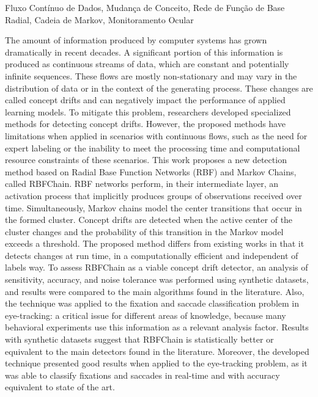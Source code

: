 \documentclass[msc, classic, a4paper]{ufbathesis}
\begin{document}
\begin{keywords}
    Fluxo Contínuo de Dados, Mudança de Conceito, Rede de Função de Base Radial, Cadeia de Markov, Monitoramento Ocular
\end{keywords}

\abstract
The amount of information produced by computer systems has grown dramatically in recent decades.
A significant portion of this information is produced as continuous streams of data, which are constant and potentially infinite sequences.
These flows are mostly non-stationary and may vary in the distribution of data or in the context of the generating process.
These changes are called concept drifts and can negatively impact the performance of applied learning models.
To mitigate this problem, researchers developed specialized methods for detecting concept drifts.
However, the proposed methods have limitations when applied in scenarios with continuous flows,
such as the need for expert labeling or the inability to meet the processing time and computational resource constraints of these scenarios.
This work proposes a new detection method based on Radial Base Function Networks (RBF) and Markov Chains, called RBFChain.
RBF networks perform, in their intermediate layer, an activation process that implicitly produces groups of observations received over time.
Simultaneously, Markov chains model the center transitions that occur in the formed cluster.
Concept drifts are detected when the active center of the cluster changes and the probability of this transition in the Markov model exceeds a threshold.
The proposed method differs from existing works in that it detects changes at run time,  in a computationally efficient and independent of labels way.
%
To assess RBFChain as a viable concept drift detector, an analysis of sensitivity, accuracy, and noise tolerance was performed using synthetic datasets, and results were compared to the main algorithms found in the literature.
%
Also, the technique was applied to the fixation and saccade classification problem in eye-tracking: a critical issue for different areas of knowledge, because many behavioral experiments use this information as a relevant analysis factor.
%
Results with synthetic datasets suggest that RBFChain is statistically better or equivalent to the main detectors found in the literature.
Moreover, the developed technique presented good results when applied to the eye-tracking problem, as it was able to classify fixations and saccades in real-time and with accuracy equivalent to state of the art.
\end{document}

